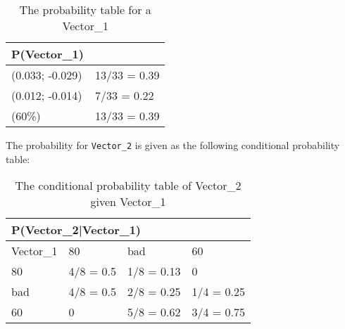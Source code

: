 \begin{center}
\begin{table}[H]
\begin{tabular}{|l|l|}
\hline
P(Vector\_1) &\\ \hline
(0.033; -0.029) & 13/33 = 0.39   \\ \hline 
(0.012; -0.014) & 7/33 = 0.22  \\ \hline
(60\%)   & 13/33 = 0.39  \\ \hline
\end{tabular}
\caption{The probability table for a Vector\_1}
\label{Vector0Table}
\end{table}
\end{center}

The probability for \texttt{Vector\_2} is given as the following conditional
probability table: 
\begin{table}[]
\centering
\begin{tabular}{|l|l|l|l|}
\hline
\multicolumn{4}{|l|}{P(Vector\_2|Vector\_1)} \\ \hline
 Vector\_1 & 80    & bad    & 60    \\ \hline
 80    & 4/8 = 0.5    & 1/8 = 0.13    & 0    \\ \hline
 bad   & 4/8 = 0.5    & 2/8 = 0.25    & 1/4 = 0.25  \\ \hline
 60    & 0            & 5/8 = 0.62    & 3/4 = 0.75  \\ \hline
\end{tabular}
\caption{The conditional probability table of Vector\_2 given Vector\_1}
\label{vector2tab} 
\end{table}




